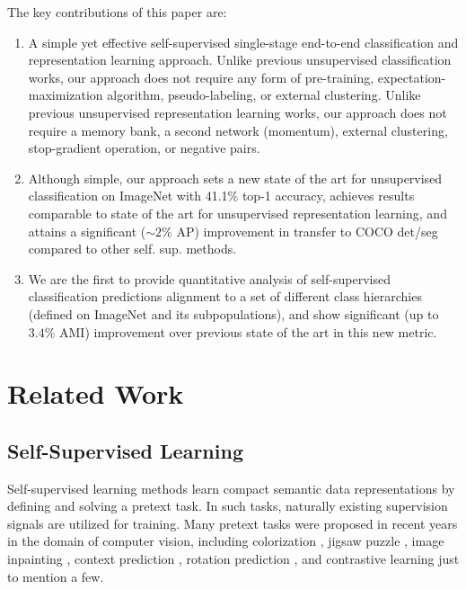 \documentclass[runningheads]{llncs}
\begin{document}
The key contributions of this paper are:
\begin{enumerate}
    \item A simple yet effective self-supervised single-stage end-to-end classification and representation learning approach. Unlike previous unsupervised classification works, our approach does not require any form of pre-training, expectation-maximization algorithm, pseudo-labeling, or external clustering. Unlike previous unsupervised representation learning works, our approach does not require a memory bank, a second network (momentum), external clustering, stop-gradient operation, or negative pairs.
    \item Although simple, our approach sets a new state of the art for unsupervised classification on ImageNet with 41.1\% top-1 accuracy, achieves results comparable to state of the art for unsupervised representation learning, and attains a significant ($\sim 2\%$ AP) improvement in transfer to COCO det/seg compared to other self. sup. methods.
    \item We are the first to provide quantitative analysis of self-supervised classification predictions alignment to a set of different class hierarchies (defined on ImageNet and its subpopulations), and show significant (up to $3.4\%$ AMI) improvement over previous state of the art in this new metric. 
\end{enumerate}



\section{Related Work}
\subsection{Self-Supervised Learning}
\label{section:self_supervised_learning}
Self-supervised learning methods learn compact semantic data representations by defining and solving a pretext task. In such tasks, naturally existing supervision signals are utilized for training. Many pretext tasks were proposed in recent years in the domain of computer vision, including colorization \cite{zhang2016colorful}, jigsaw puzzle \cite{noroozi2016unsupervised}, image inpainting \cite{pathak2016context}, context prediction \cite{doersch2015unsupervised}, rotation prediction \cite{DBLP:conf/iclr/GidarisSK18}, and contrastive learning \cite{wu2018unsupervised,dosovitskiy2014discriminative,DBLP:journals/corr/abs-2002-05709,chen2020big,he2020momentum,chen2020improved,caron2020unsupervised,misra2020self} just to mention a few.
\end{document}
